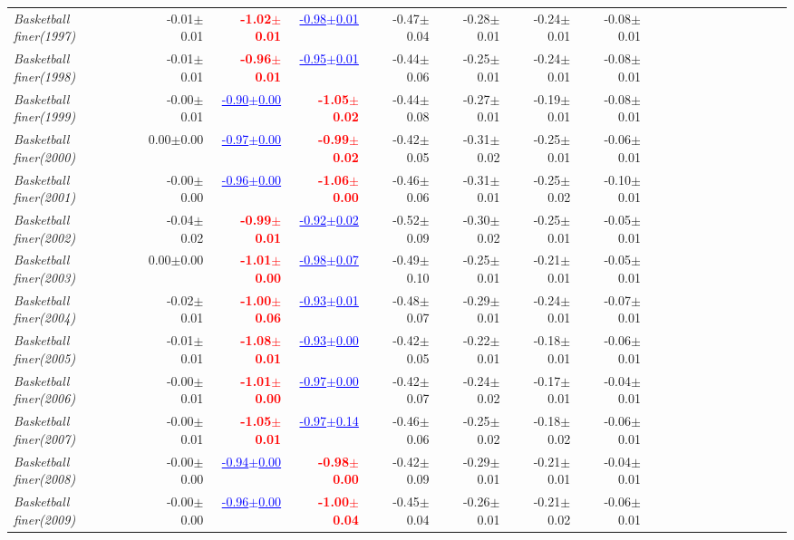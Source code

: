 \documentclass[nohyperref]{article}
\theoremstyle{plain}
\theoremstyle{definition}
\theoremstyle{remark}
\newcommand{\red}[1]{\textcolor{red}{\textbf{#1}}}
\newcommand{\blue}[1]{\textcolor{blue}{\underline{#1}}}
\begin{document}
\begin{table*}[!ht]
{\begin{tabular}{lrrrrrrrrrrrrrrrrrr}
			{\it Basketball finer(1997)} & -0.01$\pm$0.01 & \red{-1.02$\pm$0.01} & \blue{-0.98$\pm$0.01} & -0.47$\pm$0.04 & -0.28$\pm$0.01 & -0.24$\pm$0.01 & -0.08$\pm$0.01 \\
			{\it Basketball finer(1998)} & -0.01$\pm$0.01 & \red{-0.96$\pm$0.01} & \blue{-0.95$\pm$0.01} & -0.44$\pm$0.06 & -0.25$\pm$0.01 & -0.24$\pm$0.01 & -0.08$\pm$0.01 \\
			{\it Basketball finer(1999)} & -0.00$\pm$0.01 & \blue{-0.90$\pm$0.00} & \red{-1.05$\pm$0.02} & -0.44$\pm$0.08 & -0.27$\pm$0.01 & -0.19$\pm$0.01 & -0.08$\pm$0.01 \\
			{\it Basketball finer(2000)} & 0.00$\pm$0.00 & \blue{-0.97$\pm$0.00} & \red{-0.99$\pm$0.02} & -0.42$\pm$0.05 & -0.31$\pm$0.02 & -0.25$\pm$0.01 & -0.06$\pm$0.01 \\
			{\it Basketball finer(2001)} & -0.00$\pm$0.00 & \blue{-0.96$\pm$0.00} & \red{-1.06$\pm$0.00} & -0.46$\pm$0.06 & -0.31$\pm$0.01 & -0.25$\pm$0.02 & -0.10$\pm$0.01 \\
			{\it Basketball finer(2002)} & -0.04$\pm$0.02 & \red{-0.99$\pm$0.01} & \blue{-0.92$\pm$0.02} & -0.52$\pm$0.09 & -0.30$\pm$0.02 & -0.25$\pm$0.01 & -0.05$\pm$0.01 \\
			{\it Basketball finer(2003)} & 0.00$\pm$0.00 & \red{-1.01$\pm$0.00} & \blue{-0.98$\pm$0.07} & -0.49$\pm$0.10 & -0.25$\pm$0.01 & -0.21$\pm$0.01 & -0.05$\pm$0.01 \\
			{\it Basketball finer(2004)} & -0.02$\pm$0.01 & \red{-1.00$\pm$0.06} & \blue{-0.93$\pm$0.01} & -0.48$\pm$0.07 & -0.29$\pm$0.01 & -0.24$\pm$0.01 & -0.07$\pm$0.01 \\
			{\it Basketball finer(2005)} & -0.01$\pm$0.01 & \red{-1.08$\pm$0.01} & \blue{-0.93$\pm$0.00} & -0.42$\pm$0.05 & -0.22$\pm$0.01 & -0.18$\pm$0.01 & -0.06$\pm$0.01 \\
			{\it Basketball finer(2006)} & -0.00$\pm$0.01 & \red{-1.01$\pm$0.00} & \blue{-0.97$\pm$0.00} & -0.42$\pm$0.07 & -0.24$\pm$0.02 & -0.17$\pm$0.01 & -0.04$\pm$0.01 \\
			{\it Basketball finer(2007)} & -0.00$\pm$0.01 & \red{-1.05$\pm$0.01} & \blue{-0.97$\pm$0.14} & -0.46$\pm$0.06 & -0.25$\pm$0.02 & -0.18$\pm$0.02 & -0.06$\pm$0.01 \\
			{\it Basketball finer(2008)} & -0.00$\pm$0.00 & \blue{-0.94$\pm$0.00} & \red{-0.98$\pm$0.00} & -0.42$\pm$0.09 & -0.29$\pm$0.01 & -0.21$\pm$0.01 & -0.04$\pm$0.01 \\
			{\it Basketball finer(2009)} & -0.00$\pm$0.00 & \blue{-0.96$\pm$0.00} & \red{-1.00$\pm$0.04} & -0.45$\pm$0.04 & -0.26$\pm$0.01 & -0.21$\pm$0.02 & -0.06$\pm$0.01 \\

\end{tabular}}
\end{table*}
\end{document}
